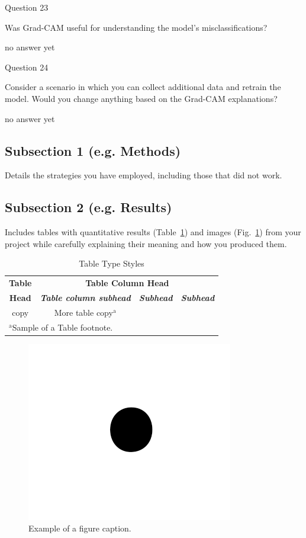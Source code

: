 \documentclass[conference]{IEEEtran}
\begin{document}
Question 23

Was Grad-CAM useful for understanding the model’s misclassifications?

no answer yet

Question 24

Consider a scenario in which you can collect additional data and retrain the model. Would you change anything based on the Grad-CAM explanations?

no answer yet

\subsection{Subsection 1 (e.g. Methods)}
 Details the strategies you have employed, including those that did not work.

\subsection{Subsection 2 (e.g. Results)}
Includes tables with quantitative results (Table~\ref{table:example}) and images (Fig.~\ref{fig:example}) from your project while carefully explaining their meaning and how you produced them.
\begin{table}[htbp]
\caption{Table Type Styles}
\begin{center}
\begin{tabular}{|c|c|c|c|}
\hline
\textbf{Table}&\multicolumn{3}{|c|}{\textbf{Table Column Head}} \\
\cline{2-4} 
\textbf{Head} & \textbf{\textit{Table column subhead}}& \textbf{\textit{Subhead}}& \textbf{\textit{Subhead}} \\
\hline
copy& More table copy$^{\mathrm{a}}$& &  \\
\hline
\multicolumn{4}{l}{$^{\mathrm{a}}$Sample of a Table footnote.}
\end{tabular}
\label{table:example}
\end{center}
\end{table}

\begin{figure}[htbp]
\centerline{\includegraphics{fig1.png}}
\caption{Example of a figure caption.}
\label{fig:example}
\end{figure}
\end{document}
